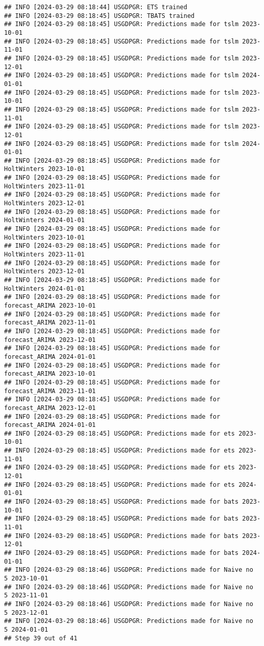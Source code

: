 \documentclass[
]{article}
\begin{document}
\begin{verbatim}
## INFO [2024-03-29 08:18:44] USGDPGR: ETS trained
## INFO [2024-03-29 08:18:45] USGDPGR: TBATS trained
## INFO [2024-03-29 08:18:45] USGDPGR: Predictions made for tslm 2023-10-01
## INFO [2024-03-29 08:18:45] USGDPGR: Predictions made for tslm 2023-11-01
## INFO [2024-03-29 08:18:45] USGDPGR: Predictions made for tslm 2023-12-01
## INFO [2024-03-29 08:18:45] USGDPGR: Predictions made for tslm 2024-01-01
## INFO [2024-03-29 08:18:45] USGDPGR: Predictions made for tslm 2023-10-01
## INFO [2024-03-29 08:18:45] USGDPGR: Predictions made for tslm 2023-11-01
## INFO [2024-03-29 08:18:45] USGDPGR: Predictions made for tslm 2023-12-01
## INFO [2024-03-29 08:18:45] USGDPGR: Predictions made for tslm 2024-01-01
## INFO [2024-03-29 08:18:45] USGDPGR: Predictions made for HoltWinters 2023-10-01
## INFO [2024-03-29 08:18:45] USGDPGR: Predictions made for HoltWinters 2023-11-01
## INFO [2024-03-29 08:18:45] USGDPGR: Predictions made for HoltWinters 2023-12-01
## INFO [2024-03-29 08:18:45] USGDPGR: Predictions made for HoltWinters 2024-01-01
## INFO [2024-03-29 08:18:45] USGDPGR: Predictions made for HoltWinters 2023-10-01
## INFO [2024-03-29 08:18:45] USGDPGR: Predictions made for HoltWinters 2023-11-01
## INFO [2024-03-29 08:18:45] USGDPGR: Predictions made for HoltWinters 2023-12-01
## INFO [2024-03-29 08:18:45] USGDPGR: Predictions made for HoltWinters 2024-01-01
## INFO [2024-03-29 08:18:45] USGDPGR: Predictions made for forecast_ARIMA 2023-10-01
## INFO [2024-03-29 08:18:45] USGDPGR: Predictions made for forecast_ARIMA 2023-11-01
## INFO [2024-03-29 08:18:45] USGDPGR: Predictions made for forecast_ARIMA 2023-12-01
## INFO [2024-03-29 08:18:45] USGDPGR: Predictions made for forecast_ARIMA 2024-01-01
## INFO [2024-03-29 08:18:45] USGDPGR: Predictions made for forecast_ARIMA 2023-10-01
## INFO [2024-03-29 08:18:45] USGDPGR: Predictions made for forecast_ARIMA 2023-11-01
## INFO [2024-03-29 08:18:45] USGDPGR: Predictions made for forecast_ARIMA 2023-12-01
## INFO [2024-03-29 08:18:45] USGDPGR: Predictions made for forecast_ARIMA 2024-01-01
## INFO [2024-03-29 08:18:45] USGDPGR: Predictions made for ets 2023-10-01
## INFO [2024-03-29 08:18:45] USGDPGR: Predictions made for ets 2023-11-01
## INFO [2024-03-29 08:18:45] USGDPGR: Predictions made for ets 2023-12-01
## INFO [2024-03-29 08:18:45] USGDPGR: Predictions made for ets 2024-01-01
## INFO [2024-03-29 08:18:45] USGDPGR: Predictions made for bats 2023-10-01
## INFO [2024-03-29 08:18:45] USGDPGR: Predictions made for bats 2023-11-01
## INFO [2024-03-29 08:18:45] USGDPGR: Predictions made for bats 2023-12-01
## INFO [2024-03-29 08:18:45] USGDPGR: Predictions made for bats 2024-01-01
## INFO [2024-03-29 08:18:46] USGDPGR: Predictions made for Naive no  5 2023-10-01
## INFO [2024-03-29 08:18:46] USGDPGR: Predictions made for Naive no  5 2023-11-01
## INFO [2024-03-29 08:18:46] USGDPGR: Predictions made for Naive no  5 2023-12-01
## INFO [2024-03-29 08:18:46] USGDPGR: Predictions made for Naive no  5 2024-01-01
## Step 39 out of 41
\end{verbatim}
\end{document}
